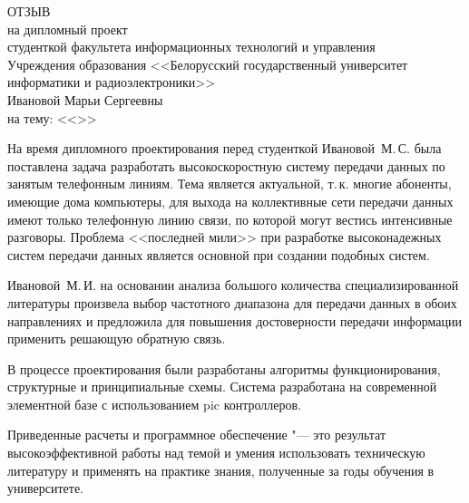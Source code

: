 

\thispagestyle{empty}

\begin{singlespace}

{\small
  \begin{center}
    \begin{minipage}{0.8\textwidth}
      \begin{center}
        {\normalsize ОТЗЫВ}\\[1em]
        на дипломный проект\\студенткой факультета информационных технологий
        и управления\\Учреждения образования <<Белорусский государственный университет информатики и радиоэлектроники>>\\
        Ивановой Марьи Сергеевны\\
        на тему: <<\topicName>>
      \end{center}
    \end{minipage}
  \end{center}

На время дипломного проектирования перед студенткой Ивановой~М.\,С. была поставлена задача разработать высокоскоростную систему передачи данных по занятым телефонным линиям.
Тема является актуальной, т.\,к. многие абоненты, имеющие дома компьютеры, для выхода на коллективные сети передачи данных имеют только телефонную линию связи, по которой могут вестись интенсивные разговоры.
Проблема <<последней мили>> при разработке высоконадежных систем передачи данных является основной при создании подобных систем.

Ивановой~М.\,И. на основании анализа большого количества специализированной литературы произвела выбор частотного диапазона для передачи данных в обоих направлениях и предложила для повышения достоверности передачи информации применить решающую обратную связь.

В процессе проектирования были разработаны алгоритмы функционирования, структурные и принципиальные схемы.
Система разработана на современной элементной базе с использованием pic контроллеров.

Приведенные расчеты и программное обеспечение "--- это результат высокоэффективной работы над темой и умения использовать техническую литературу и применять на практике знания, полученные за годы обучения в университете.

}
\end{singlespace}
